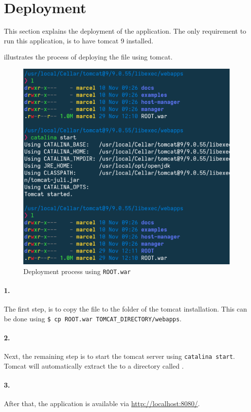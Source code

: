 \section{Deployment}\label{sec:03_depl}
This section explains the deployment of the application.
The only requirement to run this application, is to have tomcat 9 installed.

 illustrates the process of deploying the  file using tomcat.
\begin{figure}[h]
\centering
\includegraphics[scale=0.5]{images/03_depl/process}
\caption{Deployment process using \texttt{ROOT.war}}
\label{fig:subsubsec:03_depl_process}
\end{figure}

\paragraph{1.}
The first step, is to copy the  file to the  folder of the tomcat installation.
This can be done using \texttt{\$ cp ROOT.war TOMCAT\_DIRECTORY/webapps}.

\paragraph{2.}
Next, the remaining step is to start the tomcat server using \texttt{catalina start}. Tomcat will automatically extract the  to a directory called .

\paragraph{3.}
After that, the application is available via \url{http://localhost:8080/}.

